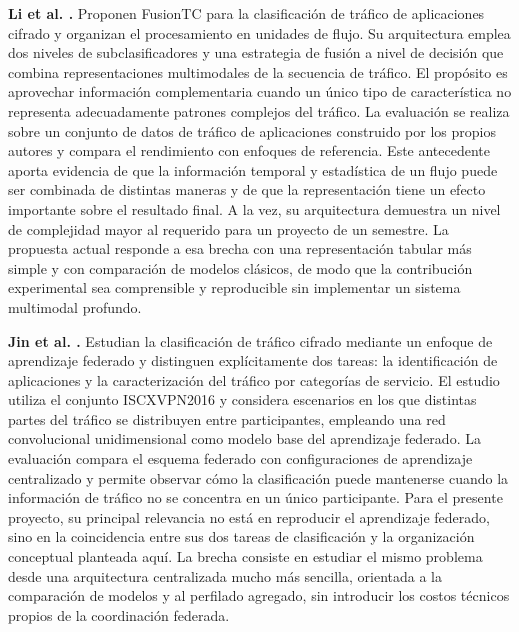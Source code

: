 \documentclass[conference]{IEEEtran}
\begin{document}
\textbf{Li et al. \cite{li2023}.} Proponen FusionTC para la clasificación de tráfico de aplicaciones cifrado y organizan el procesamiento en unidades de flujo. Su arquitectura emplea dos niveles de subclasificadores y una estrategia de fusión a nivel de decisión que combina representaciones multimodales de la secuencia de tráfico. El propósito es aprovechar información complementaria cuando un único tipo de característica no representa adecuadamente patrones complejos del tráfico. La evaluación se realiza sobre un conjunto de datos de tráfico de aplicaciones construido por los propios autores y compara el rendimiento con enfoques de referencia. Este antecedente aporta evidencia de que la información temporal y estadística de un flujo puede ser combinada de distintas maneras y de que la representación tiene un efecto importante sobre el resultado final. A la vez, su arquitectura demuestra un nivel de complejidad mayor al requerido para un proyecto de un semestre. La propuesta actual responde a esa brecha con una representación tabular más simple y con comparación de modelos clásicos, de modo que la contribución experimental sea comprensible y reproducible sin implementar un sistema multimodal profundo.

\textbf{Jin et al. \cite{jin2024}.} Estudian la clasificación de tráfico cifrado mediante un enfoque de aprendizaje federado y distinguen explícitamente dos tareas: la identificación de aplicaciones y la caracterización del tráfico por categorías de servicio. El estudio utiliza el conjunto ISCXVPN2016 y considera escenarios en los que distintas partes del tráfico se distribuyen entre participantes, empleando una red convolucional unidimensional como modelo base del aprendizaje federado. La evaluación compara el esquema federado con configuraciones de aprendizaje centralizado y permite observar cómo la clasificación puede mantenerse cuando la información de tráfico no se concentra en un único participante. Para el presente proyecto, su principal relevancia no está en reproducir el aprendizaje federado, sino en la coincidencia entre sus dos tareas de clasificación y la organización conceptual planteada aquí. La brecha consiste en estudiar el mismo problema desde una arquitectura centralizada mucho más sencilla, orientada a la comparación de modelos y al perfilado agregado, sin introducir los costos técnicos propios de la coordinación federada.
\end{document}
